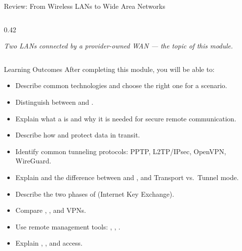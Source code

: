 \documentclass[aspectratio=169]{beamer}  %
\begin{document}
\begin{frame}{Review: From Wireless LANs to Wide Area Networks}
\begin{columns}[T]
\begin{column}{0.42\textwidth}
\begin{center}
                \par\tiny\textit{Two LANs connected by a provider-owned WAN --- the topic of this module.}
            \end{center}
        \end{column}
    \end{columns}
\end{frame}

\begin{frame}[t,allowframebreaks]{Learning Outcomes}
    After completing this module, you will be able to:
    \vspace{0.4em}
    \begin{itemize}
        \item Describe common  technologies and choose the right one for a scenario.
        \item Distinguish between  and .
        \item Explain what a  is and why it is needed for secure remote communication.
        \item Describe how  and  protect data in transit.
        \item Identify common tunneling protocols: PPTP, L2TP/IPsec, OpenVPN, WireGuard.
        \item Explain  and the difference between  and , and Transport vs.\ Tunnel mode.
        \item Describe the two phases of  (Internet Key Exchange).
        \item Compare , , and  VPNs.
        \item Use remote management tools: , , .
        \item Explain , , and  access.
    \end{itemize}
\end{frame}
\end{document}
